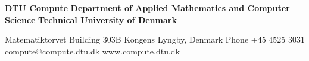 %
\thispagestyle{empty} %
\frieze
\vspace*{\fill}
\noindent
\sffamily
\small
\textbf{DTU Compute}\hfill \break
\textbf{Department of Applied Mathematics and Computer Science}\hfill \break
\textbf{Technical University of Denmark}\hfill \break
\par
\noindent
Matematiktorvet\hfill \break
Building 303B\hfill {} Kongens Lyngby, Denmark\hfill \break
Phone +45 4525 3031\hfill \break
compute@compute.dtu.dk\hfill \break
www.compute.dtu.dk\hfill \break
\normalsize
\normalfont
\vspace*{2.5cm}
